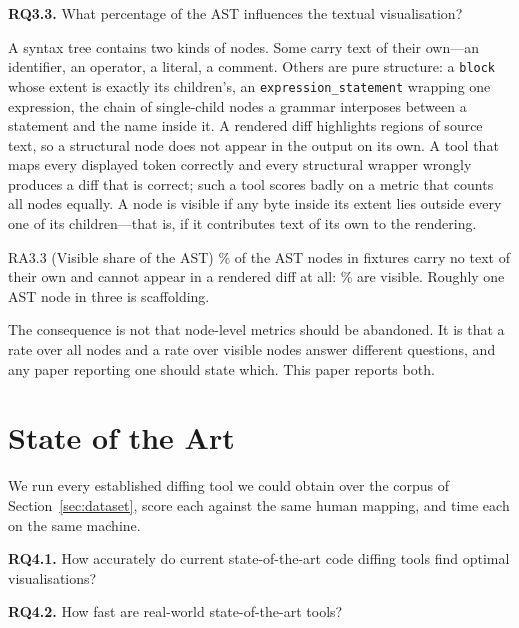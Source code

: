 \documentclass[sigconf]{acmart}
\begin{document}
\textbf{RQ3.3.} What percentage of the AST influences the textual visualisation?

A syntax tree contains two kinds of nodes. Some carry text of their own---an identifier, an
operator, a literal, a comment. Others are pure structure: a \texttt{block} whose extent is
exactly its children's, an \texttt{expression\_statement} wrapping one expression, the chain of
single-child nodes a grammar interposes between a statement and the name inside it. A rendered diff highlights regions of source text, so a structural node does not appear in the output on its own. A tool that maps every displayed token correctly and every structural wrapper wrongly produces a diff that is correct; such a tool scores badly on a metric that counts all nodes equally. A node is visible if any byte
inside its extent lies outside every one of its children---that is, if it contributes text of its own to the rendering.

\begin{resultbox}{RA3.3 (Visible share of the AST)}
\InvisibleNodeShare{}\% of the AST nodes in \NumFixtures{} fixtures carry no text of their own and cannot appear in a rendered diff at all: \VisibleNodeShare{}\% are visible. Roughly one AST node in three is scaffolding.
\end{resultbox}

The consequence is not that node-level metrics should be abandoned. It is that a rate over all
nodes and a rate over visible nodes answer different questions, and any paper reporting one should
state which. This paper reports both.

\section{State of the Art}
\label{sec:tools}

We run every established diffing tool we could obtain over the corpus of
Section~\ref{sec:dataset}, score each against the same human mapping, and time each on the same
machine.

\textbf{RQ4.1.} How accurately do current state-of-the-art code diffing tools find optimal
visualisations?

\textbf{RQ4.2.} How fast are real-world state-of-the-art tools?
\end{document}
